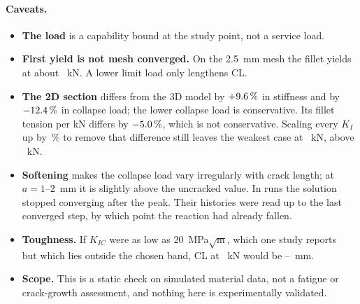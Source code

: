 \documentclass[11pt,a4paper]{article}
\begin{document}
\paragraph{Caveats.}
\begin{itemize}
\item \textbf{The load} is a capability bound at the study point, not a service load.
\item \textbf{First yield is not mesh converged.} On the 2.5~mm mesh the fillet yields at about \nClFirstYieldFinekN~kN. A lower limit load only lengthens CL.
\item \textbf{The 2D section} differs from the 3D model by $+9.6\,\%$ in stiffness and by $-12.4\,\%$ in collapse load; the lower collapse load is conservative. Its fillet tension per kN differs by $-5.0\,\%$, which is not conservative. Scaling every $K_I$ up by \nClKScalePct\,\% to remove that difference still leaves the weakest case at \nClKScaledWeakkN~kN, above \nClLimitFFkN~kN.
\item \textbf{Softening} makes the collapse load vary irregularly with crack length; at $a=1$--2~mm it is slightly above the uncracked value. In \nClUnconverged{} runs the solution stopped converging after the peak. Their histories were read up to the last converged step, by which point the reaction had already fallen.
\item \textbf{Toughness.} If $K_{IC}$ were as low as 20~MPa$\sqrt{\mathrm m}$, which one study reports~\cite{paul2021} but which lies outside the chosen band, CL at \nClLimitkN~kN would be \nClLowKMin--\nClLowKMax~mm.
\item \textbf{Scope.} This is a static check on simulated material data, not a fatigue or crack-growth assessment, and nothing here is experimentally validated.
\end{itemize}

\end{document}
